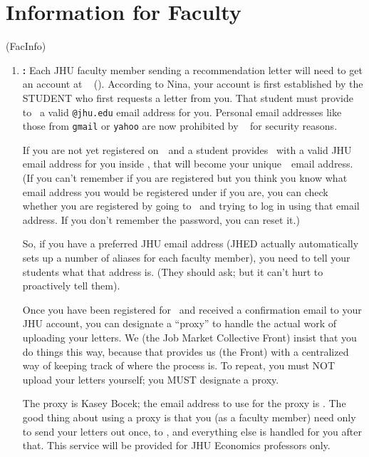 \documentclass{econtex}
\begin{document}
\section{Information for Faculty}\ifdvi\hypertarget{FacInfo}{(FacInfo)}\fi

\begin{enumerate}

\item {\bf \EJM:}
Each JHU faculty member sending a recommendation letter will need to
get an account at \EJM ~ (\EJMLink). According to Nina, your account is first established
by the STUDENT who first requests a letter from you.  That student must 
provide to \EJM~a valid \texttt{@jhu.edu} email address for you.  Personal email addresses like
those from \texttt{gmail} or \texttt{yahoo} are now prohibited by \EJM~
for security reasons.

If you are not yet registered on~\EJM~and a student provides \EJM~with
a valid JHU email address for you inside \EJM, that will become your
unique~\EJM~email address.  (If you can't remember if you are registered 
but you think you know what email address
you would be registered under if you are,  you can check whether you are
registered by going to \EJM~and trying to log in using that email
address.  If you don't remember the password, you can reset it.)  

So, if you have a preferred JHU email address (JHED actually automatically
sets up a number of aliases for each faculty member), you need to tell
your students what that address is.  (They should ask; but it can't
hurt to proactively tell them).

Once you have been registered for \EJM~and received a confirmation
email to your JHU account, you can designate a ``proxy'' to handle the
actual work of uploading your letters.  We (the Job Market Collective
Front) insist that you do things this way, because that provides us (the Front)
with a centralized way of keeping track of where the process is.  To
repeat, you must NOT upload your letters yourself; you MUST designate
a proxy.

The proxy is Kasey Bocek; the email address to use for the proxy is
\JMStaffEmail.  The good thing about using a proxy is that you (as a faculty member)
need only to send your letters out once, to \JMStaffEmail, and everything 
else is handled for you after that. This service will be provided for JHU Economics professors only.

\begin{comment}
\textcolor{red}{
\item {\bf \AJO:}
Each JHU faculty member must register at \AJOLink~ and enter Kasey Bocek as their proxy, using the
\JMStaffEmail~ email address. To do this, log in to your account and click on the `proxy' link near the bottom. This only needs to be done once and the proxy works for all applicants the faculty may have on the job market that year.}
\end{comment}


\end{enumerate}
\end{document}

